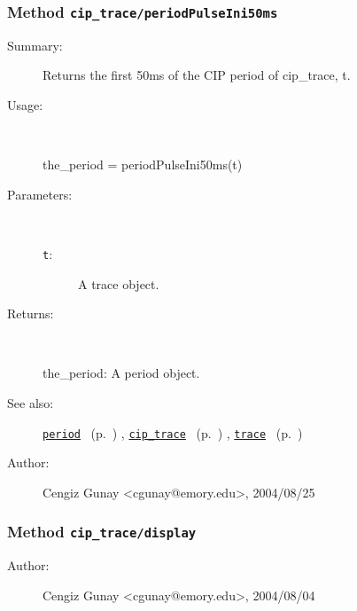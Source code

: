 \subsubsection[Method \texttt{periodPulseIni50ms}]{Method \texttt{cip\_trace/periodPulseIni50ms}}%
%
\label{ref_cip_trace__periodPulseIni50ms}%
\hypertarget{ref_cip_trace__periodPulseIni50ms}{}%
\begin{description}
\item[Summary:]Returns the first 50ms of the CIP period of 
			cip\_trace, t. 
%
\item[Usage:]~%
\begin{lyxcode}%
the\_period = periodPulseIni50ms(t)
%
\end{lyxcode}%
%
%
\item[Parameters:]~
\begin{description}%
\item[\texttt{t}:]
 A trace object.
\end{description}%
%
\item[Returns:]~

	the\_period: A period object.
%
%
\item[See also:]%
\hyperlink{ref_period}{\texttt{period}}%
\ (p.~\pageref{ref_period})%
%
, \hyperlink{ref_cip_trace}{\texttt{cip\_trace}}%
\ (p.~\pageref{ref_cip_trace})%
%
, \hyperlink{ref_trace}{\texttt{trace}}%
\ (p.~\pageref{ref_trace})%
%
%
\item[Author:]%
Cengiz Gunay <cgunay@emory.edu>, 2004/08/25%
\end{description}
\methodline%
\subsubsection[Method \texttt{display}]{Method \texttt{cip\_trace/display}}%
%
\label{ref_cip_trace__display}%
\hypertarget{ref_cip_trace__display}{}%
\begin{description}
%
%
%
%
%
%
%
\item[Author:]%
Cengiz Gunay <cgunay@emory.edu>, 2004/08/04%
\end{description}
\methodline%
